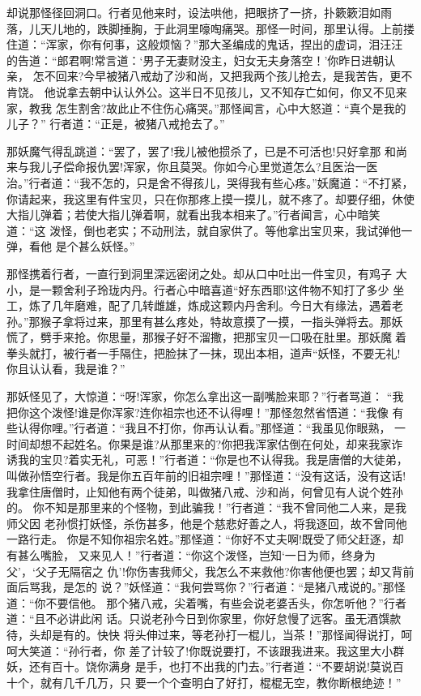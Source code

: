 却说那怪径回洞口。行者见他来时，设法哄他，把眼挤了一挤，扑簌簌泪如雨
落，儿天儿地的，跌脚捶胸，于此洞里嚎啕痛哭。那怪一时间，那里认得。上前搂
住道：“浑家，你有何事，这般烦恼？”那大圣编成的鬼话，捏出的虚词，泪汪汪
的告道：“郎君啊!常言道：‘男子无妻财没主，妇女无夫身落空！’你昨日进朝认亲，
怎不回来?今早被猪八戒劫了沙和尚，又把我两个孩儿抢去，是我苦告，更不肯饶。
他说拿去朝中认认外公。这半日不见孩儿，又不知存亡如何，你又不见来家，教我
怎生割舍?故此止不住伤心痛哭。”那怪闻言，心中大怒道：“真个是我的儿子？”
行者道：“正是，被猪八戒抢去了。”

那妖魔气得乱跳道：“罢了，罢了!我儿被他掼杀了，已是不可活也!只好拿那
和尚来与我儿子偿命报仇罢!浑家，你且莫哭。你如今心里觉道怎么?且医治一医
治。”行者道：“我不怎的，只是舍不得孩儿，哭得我有些心疼。”妖魔道：“不打紧，
你请起来，我这里有件宝贝，只在你那疼上摸一摸儿，就不疼了。却要仔细，休使
大指儿弹着；若使大指儿弹着啊，就看出我本相来了。”行者闻言，心中暗笑道：“这
泼怪，倒也老实；不动刑法，就自家供了。等他拿出宝贝来，我试弹他一弹，看他
是个甚么妖怪。”

那怪携着行者，一直行到洞里深远密闭之处。却从口中吐出一件宝贝，有鸡子
大小，是一颗舍利子玲珑内丹。行者心中暗喜道“好东西耶!这件物不知打了多少
坐工，炼了几年磨难，配了几转雌雄，炼成这颗内丹舍利。今日大有缘法，遇着老
孙。”那猴子拿将过来，那里有甚么疼处，特故意摸了一摸，一指头弹将去。那妖
慌了，劈手来抢。你思量，那猴子好不溜撒，把那宝贝一口吸在肚里。那妖魔着
拳头就打，被行者一手隔住，把脸抹了一抹，现出本相，道声“妖怪，不要无礼!
你且认认看，我是谁？”

那妖怪见了，大惊道：“呀!浑家，你怎么拿出这一副嘴脸来耶？”行者骂道：
“我把你这个泼怪!谁是你浑家?连你祖宗也还不认得哩！”那怪忽然省悟道：“我像
有些认得你哩。”行者道：“我且不打你，你再认认看。”那怪道：“我虽见你眼熟，
一时间却想不起姓名。你果是谁?从那里来的?你把我浑家估倒在何处，却来我家诈
诱我的宝贝?着实无礼，可恶！”行者道：“你是也不认得我。我是唐僧的大徒弟，
叫做孙悟空行者。我是你五百年前的旧祖宗哩！”那怪道：“没有这话，没有这话!
我拿住唐僧时，止知他有两个徒弟，叫做猪八戒、沙和尚，何曾见有人说个姓孙的。
你不知是那里来的个怪物，到此骗我！”行者道：“我不曾同他二人来，是我师父因
老孙惯打妖怪，杀伤甚多，他是个慈悲好善之人，将我逐回，故不曾同他一路行走。
你是不知你祖宗名姓。”那怪道：“你好不丈夫啊!既受了师父赶逐，却有甚么嘴脸，
又来见人！”行者道：“你这个泼怪，岂知‘一日为师，终身为父’，‘父子无隔宿之
仇’!你伤害我师父，我怎么不来救他?你害他便也罢；却又背前面后骂我，是怎的
说？”妖怪道：“我何尝骂你？”行者道：“是猪八戒说的。”那怪道：“你不要信他。
那个猪八戒，尖着嘴，有些会说老婆舌头，你怎听他？”行者道：“且不必讲此闲
话。只说老孙今日到你家里，你好怠慢了远客。虽无酒馔款待，头却是有的。快快
将头伸过来，等老孙打一棍儿，当茶！”那怪闻得说打，呵呵大笑道：“孙行者，你
差了计较了!你既说要打，不该跟我进来。我这里大小群妖，还有百十。饶你满身
是手，也打不出我的门去。”行者道：“不要胡说!莫说百十个，就有几千几万，只
要一个个查明白了好打，棍棍无空，教你断根绝迹！”

